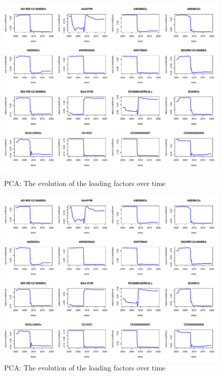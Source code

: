 \documentclass{article}
\begin{document}
\begin{subfigures}
\begin{figure}[hbt!]
\includegraphics[page = 9, width=\textwidth]{plots/pca_loads}
\label{fig:pca_loads}
\caption{\label{ninth}PCA: The evolution of the loading factors over time}
\centering
\end{figure}

\begin{figure}[hbt!]
\includegraphics[page = 10, width=\textwidth]{plots/pca_loads}
\caption{\label{tenth}PCA: The evolution of the loading factors over time}
\label{fig:pca_loads}
\centering
\end{figure}


\end{subfigures}
\end{document}
